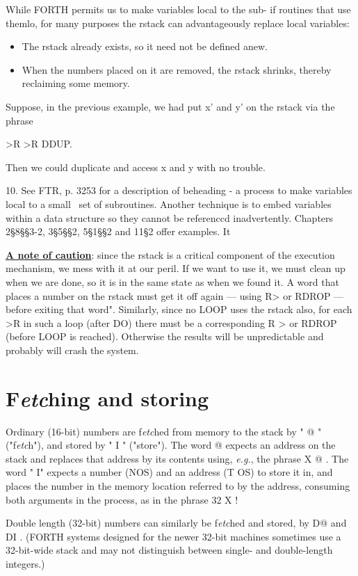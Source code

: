 While FORTH permits us to make variables local to the sub- if routines that use themlo, for many purposes the rstack can advantageously replace local variables:

\begin{itemize}
	\item The rstack already exists, so it need not be defined anew.
	\item When the numbers placed on it are removed, the rstack shrinks, thereby reclaiming some memory.
\end{itemize}

Suppose, in the previous example, we had put x’ and y’ on the rstack via the phrase

>R >R DDUP.

Then we could duplicate and access x and y with no trouble.

10. See FTR, p. 3253 for a description of beheading - a process to make variables local to a small \ set of subroutines. Another technique is to embed variables within a data structure so they cannot be referenccd inadvertently. Chapters 2§8§§3-2, 3§5§§2, 5§1§§2 and 11§2 offer examples. It

\underline{\textbf{A note of caution}}: since the rstack is a critical component of the execution mechanism, we mess with it at our peril. If we want to use it, we must clean up when we are done, so it is in the same state as when we found it. A word that places a number on the rstack must get it off again — using R> or RDROP — before exiting that word". Similarly, since no LOOP uses the rstack also, for each >R in such a loop (after DO) there must be a corresponding R > or RDROP (before LOOP is reached). Otherwise the results will be unpredictable and probably will crash the system.

\section{F\textit{etc}hing and storing}

Ordinary (16-bit) numbers are f\textit{etc}hed from memory to the stack by " @ " ("f\textit{etc}h"), and stored by " I " ("store"). The word @ expects an address on the stack and replaces that address by its contents using, \textit{e.g.}, the phrase X @ . The word " I" expects a number (NOS) and an address (T OS) to store it in, and places the number in the memory location referred to by the address, consuming both arguments in the process, as in the phrase 32 X !

Double length (32-bit) numbers can similarly be f\textit{etc}hed and stored, by D@ and DI . (FORTH systems designed for the newer 32-bit machines sometimes use a 32-bit-wide stack and may not distinguish between single- and double-length integers.)

